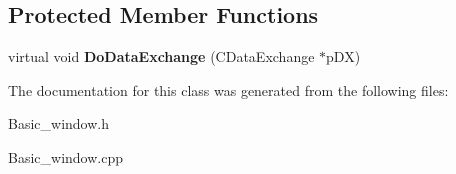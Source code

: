 \subsection*{Protected Member Functions}
\begin{DoxyCompactItemize}
\item 
\hypertarget{class_basic__window_a7ba1ea061979fb4fc4a08dcd07f11fb1}{}virtual void {\bfseries Do\+Data\+Exchange} (C\+Data\+Exchange $\ast$p\+D\+X)\label{class_basic__window_a7ba1ea061979fb4fc4a08dcd07f11fb1}

\end{DoxyCompactItemize}


The documentation for this class was generated from the following files\+:\begin{DoxyCompactItemize}
\item 
Basic\+\_\+window.\+h\item 
Basic\+\_\+window.\+cpp\end{DoxyCompactItemize}
